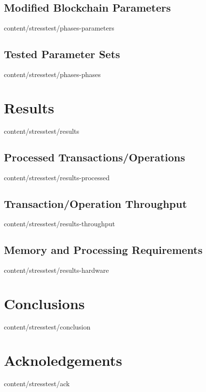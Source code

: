 \documentclass{btswhitepaper}
\begin{document}
\subsection { Modified Blockchain Parameters     }  { content/stresstest/phases-parameters  } 
\subsection { Tested Parameter Sets              }  { content/stresstest/phases-phases      } 
\section    { Results                            }  { content/stresstest/results            } 
\subsection { Processed Transactions/Operations  }  { content/stresstest/results-processed  } 
\subsection { Transaction/Operation Throughput   }  { content/stresstest/results-throughput } 
\subsection { Memory and Processing Requirements }  { content/stresstest/results-hardware   } 
\section    { Conclusions                        }  { content/stresstest/conclusion         } 
\section    { Acknoledgements                    }  { content/stresstest/ack                } 



\end{document}
